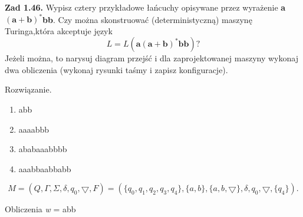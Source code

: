 \documentclass[12pt]{article}
\begin{document}
\newpage

\noindent\textbf{Zad 1.46.} Wypisz cztery przykładowe łańcuchy opisywane przez wyrażenie \textbf{a}$(\textbf{a}+\textbf{b})^*$\textbf{bb}. Czy można skonstruować (deterministyczną) maszynę Turinga,która akceptuje język
\[L=L(\textbf{a}(\textbf{a}+\textbf{b})^*\textbf{bb})?\]
Jeżeli można, to narysuj diagram przejść i dla zaprojektowanej maszyny wykonaj dwa obliczenia (wykonaj rysunki taśmy i zapisz konfiguracje).

 Rozwiązanie.
 
\begin{enumerate}
  	\item abb 
 	\item aaaabbb
  	\item ababaaabbbb
  	\item aaabbaabbabb
\end{enumerate}
\[M=(Q,\Gamma,\Sigma,\delta,q_0,\bigtriangledown,F)=(\{q_0,q_1,q_2,q_3,q_4\},\{a,b\},\{a,b,\bigtriangledown\},\delta,q_0,\bigtriangledown,\{q_4\}).\]

\begin{center}
\end{center}

Obliczenia \textit{w} = abb

\vspace{5pt}
\end{document}
